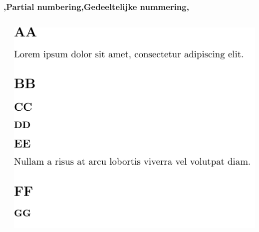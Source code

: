 \begin{frame}
    \frametitle{\lang,Partial numbering,Gedeeltelijke nummering,}
    
    \begin{columns}
        \begin{column}{0.5\textwidth}
        \end{column}
        \begin{column}{0.5\textwidth}
            \includegraphics[width=\linewidth,height=0.8\textheight,keepaspectratio]{assets/partialNumberedSecnumdepth0.pdf}
        \end{column}
    \end{columns}
\end{frame}

